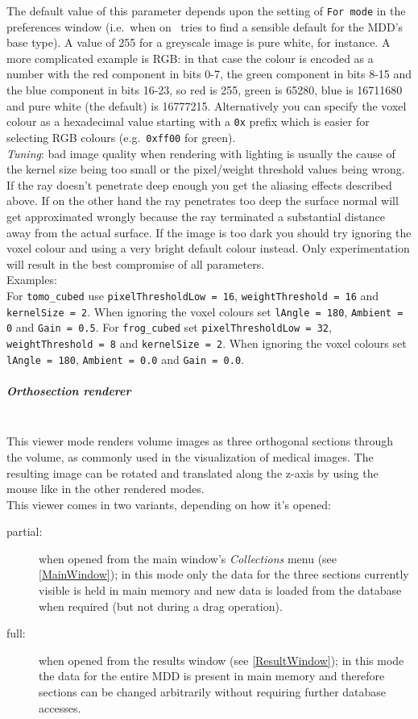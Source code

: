 \documentclass[11pt]{article}
\begin{document}
The default value of this parameter depends upon the setting of
\texttt{For mode} in the preferences window (i.e.\ when on \rview\ tries to find a sensible
default for the MDD's base type). A value of 255 for a greyscale image is pure white,
for instance. A more complicated example is RGB: in that case the colour is encoded as
a number with the red component in bits 0-7, the green component in bits 8-15
and the blue component in bits 16-23, so red is 255, green is 65280, blue is
16711680 and pure white (the default) is 16777215. Alternatively you can specify
the voxel colour as a hexadecimal value starting with a \texttt{0x} prefix which is
easier for selecting RGB colours (e.g.\ \texttt{0xff00} for green).\\
\emph{Tuning}: bad image quality when rendering with lighting is usually the cause of the
kernel size being too small or the pixel/weight threshold values being wrong. If the
ray doesn't penetrate deep enough you get the aliasing effects described above. If
on the other hand the ray penetrates too deep the surface normal will get approximated
wrongly because the ray terminated a substantial distance away from the actual surface.
If the image is too dark you should try ignoring the voxel colour and using a very
bright default colour instead. Only experimentation will result in the best compromise of all
parameters.\\
Examples:\\
For \texttt{tomo\_cubed} use \texttt{pixelThresholdLow = 16}, \texttt{weightThreshold = 16} and
\texttt{kernelSize = 2}. When ignoring the voxel colours set \texttt{lAngle = 180},
\texttt{Ambient = 0} and \texttt{Gain = 0.5}. For \texttt{frog\_cubed} set \texttt{pixelThresholdLow = 32},
\texttt{weightThreshold = 8} and \texttt{kernelSize = 2}. When ignoring the voxel colours set
\texttt{lAngle = 180}, \texttt{Ambient = 0.0} and \texttt{Gain = 0.0}.


\subparagraph{Orthosection renderer} \label{ImageModeOrtho}
\ \\
This viewer mode renders volume images as three orthogonal sections through the
volume, as commonly used in the visualization of medical images. The resulting
image can be rotated and translated along the z-axis by using the mouse like in
the other rendered modes.\\
This viewer comes in two variants, depending on how it's opened:

\begin{description}
\item[partial:] when opened from the main window's \emph{Collections} menu
(see \ref{MainWindow}); in this mode only the data for the three sections currently
visible is held in main memory and new data is loaded from the database
when required (but not during a drag operation).
\item[full:] when opened from the results window (see \ref{ResultWindow}); in
this mode the data for the entire MDD is present in main memory and therefore
sections can be changed arbitrarily without requiring further database accesses.
\end{description}
\end{document}
